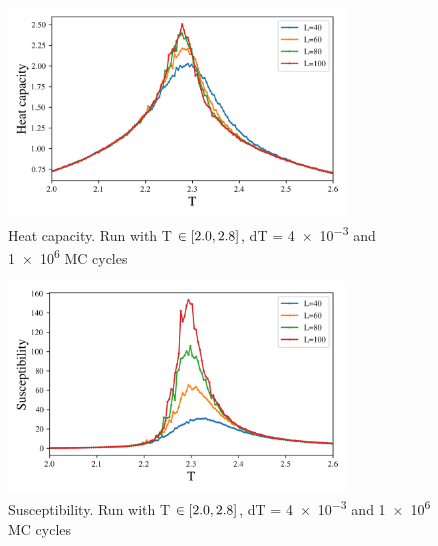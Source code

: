 \begin{figure}[H]
  \centering
  \includegraphics[width=0.8\textwidth]{../figures/phase_cv.png}
  \caption{Heat capacity. Run with T $\in \left[2.0,2.8\right]$, dT = \num{4e-3} and
  \num{1e6} MC cycles}
  \label{fig:phase_cv}
\end{figure}


\begin{figure}[H]
  \centering
  \includegraphics[width=0.8\textwidth]{../figures/phase_suscept.png}
  \caption{Susceptibility. Run with T $\in \left[2.0,2.8\right]$, dT = \num{4e-3} and
  \num{1e6} MC cycles}
  \label{fig:phase_suscept}
\end{figure}
